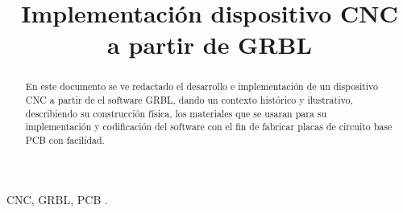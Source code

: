 \documentclass[conference]{IEEEtran}
\begin{document}
\title{Implementación dispositivo CNC \\a partir de GRBL}

\author{

}

\maketitle

\begin{abstract}
En este documento se ve redactado el desarrollo e implementación de un dispositivo CNC a partir de el software GRBL,  dando un contexto histórico y ilustrativo, describiendo su construcción  física, los materiales que se usaran para su implementación  y codificación del software con el fin de fabricar placas de circuito base PCB con facilidad. 

\end{abstract}

\begin{IEEEkeywords}
CNC, GRBL, PCB  .
\end{IEEEkeywords}
\end{document}
